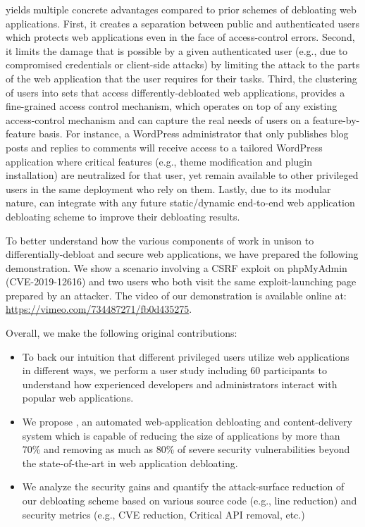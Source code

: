 
\dbltr{} yields multiple concrete advantages compared to prior schemes of debloating web applications. First, it creates a separation between public and authenticated users which protects web applications even in the face of access-control errors. 
Second, it limits the damage that is possible by a given authenticated user (e.g., due to compromised credentials or client-side attacks) by limiting the attack to the parts of the web application that the user requires for their tasks. 
Third, the clustering of users into sets that access differently-debloated web applications, provides a fine-grained access control mechanism, which operates on top of any existing access-control mechanism and can capture the real needs of users on a feature-by-feature basis. 
For instance, a WordPress administrator that only publishes blog posts and replies to comments will receive access to a tailored WordPress application where critical features (e.g., theme modification and plugin installation) are neutralized for that user, yet remain available to other privileged users in the same deployment who rely on them. 
Lastly, due to its modular nature, \dbltr{} can integrate with any future static/dynamic end-to-end web application debloating scheme to improve their debloating results. 

To better understand how the various components of \dbltr{} work in unison to differentially-debloat and secure web applications, we have prepared the following demonstration. We show a scenario involving a CSRF exploit on phpMyAdmin (CVE-2019-12616) and two users who both visit the same exploit-launching page prepared by an attacker. The video of our demonstration is available online at: \url{https://vimeo.com/734487271/fb0d435275}.

\noindent Overall, we make the following original contributions:


\begin{itemize}
    \item To back our intuition that different privileged users utilize web applications in different ways, we perform a user study including 60 participants to understand how experienced developers and administrators interact with popular web applications.
    \item We propose \dbltr{}, an automated web-application debloating and content-delivery system which is capable of reducing the size of applications by more than 70\% and removing as much as 80\% of severe security vulnerabilities beyond the state-of-the-art in web application debloating.
    \item We analyze the security gains and quantify the attack-surface reduction of our debloating scheme based on various source code (e.g., line reduction) and security metrics (e.g., CVE reduction, Critical API removal, etc.)
\end{itemize}